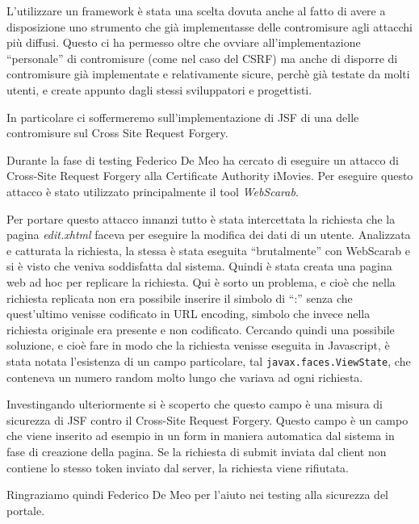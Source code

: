 \documentclass{article}
\begin{document}
L'utilizzare un framework è stata una scelta dovuta anche al fatto di avere a disposizione uno strumento che già implementasse delle contromisure agli attacchi più diffusi. Questo ci ha permesso oltre che ovviare all'implementazione ``personale'' di contromisure (come nel caso del CSRF) ma anche di disporre di contromisure già implementate e relativamente sicure, perchè già testate da molti utenti, e create appunto dagli stessi sviluppatori e progettisti.

In particolare ci soffermeremo sull'implementazione di JSF di una delle contromisure sul Cross Site Request Forgery. 

Durante la fase di testing Federico De Meo ha cercato di eseguire un attacco di Cross-Site Request Forgery alla Certificate Authority iMovies. Per eseguire questo attacco è stato utilizzato principalmente il tool \emph{WebScarab}. 

Per portare questo attacco innanzi tutto è stata intercettata la richiesta che la pagina \emph{edit.xhtml} faceva per eseguire la modifica dei dati di un utente. Analizzata e catturata la richiesta, la stessa è stata eseguita ``brutalmente'' con WebScarab e si è visto che veniva soddisfatta dal sistema.
Quindi è stata creata una pagina web ad hoc per replicare la richiesta. Qui è sorto un problema, e cioè che nella richiesta replicata non era possibile inserire il simbolo di ``:'' senza che quest'ultimo venisse codificato in URL encoding, simbolo che invece nella richiesta originale era presente e non codificato.
Cercando quindi una possibile soluzione, e cioè fare in modo che la richiesta venisse eseguita in Javascript, è stata notata l'esistenza di un campo particolare, tal {\tt javax.faces.ViewState}, che conteneva un numero random molto lungo che variava ad ogni richiesta. 

Investingando ulteriormente si è scoperto che questo campo è una misura di sicurezza di JSF contro il Cross-Site Request Forgery.
Questo campo è un campo che viene inserito ad esempio in un form in maniera automatica dal sistema in fase di creazione della pagina. Se la richiesta di submit inviata dal client non contiene lo stesso token inviato dal server, la richiesta viene rifiutata.

Ringraziamo quindi Federico De Meo per l'aiuto nei testing alla sicurezza del portale.

\end{document}
